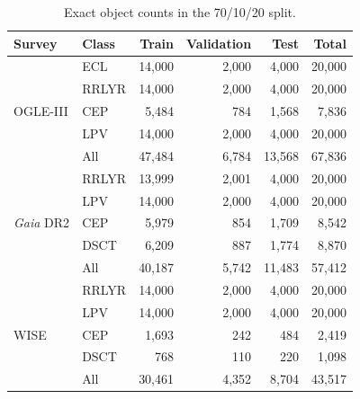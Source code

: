 \begin{table}[t]
\centering
\caption{Exact object counts in the 70/10/20 split.}
\label{tab:counts}
\begin{tabular}{llrrrr}
\toprule
Survey & Class & Train & Validation & Test & Total\\
\midrule
\multirow{5}{*}{OGLE-III} & ECL & 14,000 & 2,000 & 4,000 & 20,000\\
 & RRLYR & 14,000 & 2,000 & 4,000 & 20,000\\
 & CEP & 5,484 & 784 & 1,568 & 7,836\\
 & LPV & 14,000 & 2,000 & 4,000 & 20,000\\
 & All & 47,484 & 6,784 & 13,568 & 67,836\\
\midrule
\multirow{5}{*}{\textit{Gaia} DR2} & RRLYR & 13,999 & 2,001 & 4,000 & 20,000\\
 & LPV & 14,000 & 2,000 & 4,000 & 20,000\\
 & CEP & 5,979 & 854 & 1,709 & 8,542\\
 & DSCT & 6,209 & 887 & 1,774 & 8,870\\
 & All & 40,187 & 5,742 & 11,483 & 57,412\\
\midrule
\multirow{5}{*}{WISE} & RRLYR & 14,000 & 2,000 & 4,000 & 20,000\\
 & LPV & 14,000 & 2,000 & 4,000 & 20,000\\
 & CEP & 1,693 & 242 & 484 & 2,419\\
 & DSCT & 768 & 110 & 220 & 1,098\\
 & All & 30,461 & 4,352 & 8,704 & 43,517\\
\bottomrule
\end{tabular}
\end{table}
